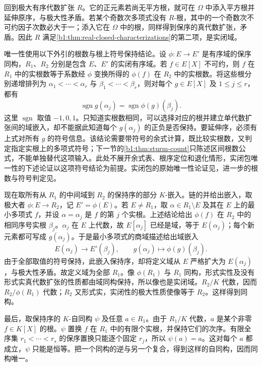 \begin{proofsketch}
	回到极大有序代数扩张 \(R\)。它的正元素若尚无平方根，就可在 \(\Omega\) 中添入平方根并延伸原序，与极大性矛盾。若某个奇数次多项式没有 \(R\)-根，其中的一个奇数次不可约因子次数必大于一；添入它在 \(\Omega\) 中的根，同样得到保序的真代数扩张，矛盾。因此 \(R\) 满足\cref{b1:thm:real-closed-characterizations}的第二项，是实闭域。

	唯一性使用以下外引的根数与根上符号保持结论。设 \(\phi:E\to E'\) 是有序域的保序同构，\(R_1\)、\(R_2\) 分别是包含 \(E\)、\(E'\) 的实闭有序域。若 \(f\in E[X]\) 不可约，则 \(f\) 在 \(R_1\) 中的实根数等于系数经 \(\phi\) 变换所得的 \(\phi(f)\) 在 \(R_2\) 中的实根数。将这些根分别递增排列为 \(\alpha_1<\cdots<\alpha_r\) 与 \(\beta_1<\cdots<\beta_r\)，则对每个 \(g\in E[X]\) 及 \(1\le j\le r\)，都有
	\[
		\operatorname{sgn}g(\alpha_j)=\operatorname{sgn}\phi(g)(\beta_j).
	\]
	这里 \(\operatorname{sgn}\) 取值 \(-1,0,1\)。只知道实根数相同，可以选择对应的根并建立单代数扩张间的域嵌入，却不能据此知道每个 \(g(\alpha_j)\) 的正负是否保持。要延伸序，必须有上式对所有 \(g\) 的符号信息。该结论需要带符号的余式计算，既比较实根数，又判定指定实根上的多项式符号；下一节的\cref{b1:thm:sturm-count}只陈述区间根数公式，不能单独替代这项输入。此处不展开余式表、根序定位和退化情形，实闭包唯一性的下述论证以这项符号结论为前提。实闭包的原始唯一性论证见\cite[Satz 8]{ArtinSchreier1927RealFields}，进一步的根数与符号判定见\cite[Sections 1.2--1.4]{BochnakCosteRoy1998RealAG}。

	现在取所有从 \(R_1\) 的中间域到 \(R_2\) 的保持序的部分 \(K\)-嵌入。链的并给出嵌入，取极大者 \(\phi:E\to R_2\)，记 \(E'=\phi(E)\)。若 \(E\ne R_1\)，取 \(\alpha\in R_1\setminus E\) 及其在 \(E\) 上的最小多项式 \(f\)，并设 \(\alpha=\alpha_j\) 是 \(f\) 的第 \(j\) 个实根。上述结论给出 \(\phi(f)\) 在 \(R_2\) 中的相同序号实根 \(\beta_j\)。\(\alpha_j\) 在 \(E\) 上代数，故 \(E[\alpha_j]\) 已经是域，等于 \(E(\alpha_j)\)；每个新元素都可写成 \(g(\alpha_j)\)。于是最小多项式的商域描述给出域嵌入
	\[
		E(\alpha_j)\longrightarrow E'(\beta_j),\qquad g(\alpha_j)\longmapsto\phi(g)(\beta_j).
	\]
	由于全部取值的符号保持，此嵌入保持序，却将定义域从 \(E\) 严格扩大为 \(E(\alpha_j)\)，与极大性矛盾。故定义域为全部 \(R_1\)。像 \(\phi(R_1)\) 与 \(R_1\) 同构，形式实性及没有形式实真代数扩张的性质都由域同构保持，所以像也是实闭域。\(R_2/K\) 代数，因而 \(R_2/\phi(R_1)\) 代数；\(R_2\) 又形式实，实闭性的极大性质使像等于 \(R_2\)。这样得到同构。

	最后，取保持序的 \(K\)-自同构 \(\psi\) 及任意 \(a\in R_1\)。由于 \(R_1/K\) 代数，\(a\) 是某个非零 \(f\in K[X]\) 的根。\(\psi\) 置换 \(f\) 在 \(R_1\) 中的有限个实根，并保持它们的次序。有限全序集 \(r_1<\cdots<r_s\) 的保序置换只能逐个固定 \(r_j\)，所以 \(\psi(a)=a\)。这对每个 \(a\) 都成立，\(\psi\) 只能是恒等。把一个同构的逆与另一个复合，得到这样的自同构，因而同构唯一。
\end{proofsketch}

